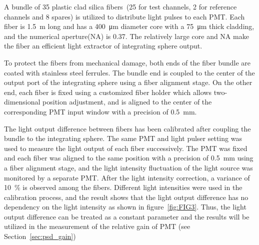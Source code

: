 \documentclass{JINST}
\begin{document}
A bundle of 35 plastic clad silica fibers~\cite{optical_fibre}(25 for test channels, 2 for reference channels and 8 spares) is utilized to distribute light pulses to each PMT.	Each fiber is \SI{1.5}{\meter} long and has a \SI{400}{\micro\meter} diameter core with a \SI{75}{\micro\meter} thick cladding, and the numerical aperture(NA) is 0.37.
The relatively large core and NA make the fiber an efficient light extractor of integrating sphere output. 
	
To protect the fibers from mechanical damage, both ends of the fiber bundle are coated with stainless steel ferrules.
The bundle end is coupled to the center of the output port of the integrating sphere using a fiber alignment stage.
On the other end, each fiber is fixed using a customized fiber holder which allows two-dimensional position adjustment, and is aligned to the center of the corresponding PMT input window with a precision of \SI{0.5}{\milli\meter}.
	
The light output difference between fibers has been calibrated after coupling the bundle to the integrating sphere.
The same PMT and light pulser setting was used to measure the light output of each fiber successively.
The PMT was fixed and each fiber was aligned to the same position with a precision of \SI{0.5}{\milli\meter} using a fiber alignment stage, and the light intensity fluctuation of the light source was monitored by a separate PMT.
After the light intensity correction, a variance of \SI{10}{\percent} is observed among the fibers.
Different light intensities were used in the calibration process, and the result shows that the light output difference has no dependency on the light intensity as shown in figure~\ref{fig:FIG3}. 
Thus, the light output difference can be treated as a constant parameter and the results will be utilized in the measurement of the relative gain of PMT (see Section~\ref{sec:psd_gain})
	
\end{document}
